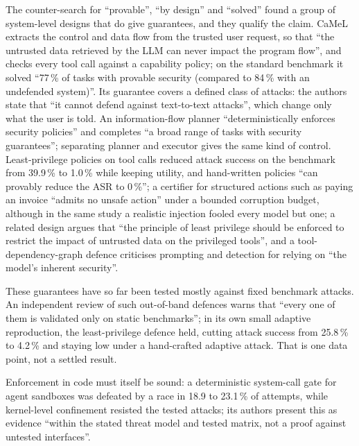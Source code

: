 The counter-search for \enquote{provable}, \enquote{by design} and
\enquote{solved} found a group of system-level designs that do give
guarantees, and they qualify the claim. CaMeL extracts the control and
data flow from the trusted user request, so that \enquote{the untrusted
data retrieved by the LLM can never impact the program flow}, and checks
every tool call against a capability policy; on the standard benchmark
it solved \enquote{77\,\% of tasks with provable security (compared to
84\,\% with an undefended system)}\autocite{Debenedetti2026CaMeL}. Its
guarantee covers a defined class of attacks: the authors state that
\enquote{it cannot defend against text-to-text attacks}, which change
only what the user is told. An information-flow planner
\enquote{deterministically enforces security policies} and completes
\enquote{a broad range of tasks with security
guarantees}\autocite{Costa2026FIDES}; separating planner and executor
gives the same kind of control\autocite{Wu2024IFC}. Least-privilege
policies on tool calls reduced attack success on the benchmark from
39.9\,\% to 1.0\,\% while keeping utility, and hand-written policies
\enquote{can provably reduce the ASR to 0\,\%}\autocite{Shi2025Progent};
a certifier for structured actions such as paying an invoice
\enquote{admits no unsafe action} under a bounded corruption budget,
although in the same study a realistic injection fooled every model but
one\autocite{Pandey2026Certified};
a related design argues that \enquote{the principle of least privilege
should be enforced to restrict the impact of untrusted data on the
privileged tools}\autocite{Kim2025PFI}, and a tool-dependency-graph
defence criticises prompting and detection for relying on \enquote{the
model's inherent security}\autocite{An2025IPIGuard}.

These guarantees have so far been tested mostly against fixed benchmark
attacks. An independent review of such out-of-band defences warns that
\enquote{every one of them is validated only on static benchmarks}; in its
own small adaptive reproduction, the least-privilege defence held, cutting
attack success from 25.8\,\% to 4.2\,\% and staying low under a
hand-crafted adaptive attack\autocite{Narisetty2026OutOfBand}. That is
one data point, not a settled result.

Enforcement in code must itself be sound: a deterministic system-call
gate for agent sandboxes was defeated by a race in 18.9 to 23.1\,\% of
attempts, while kernel-level confinement resisted the tested attacks; its
authors present this as evidence \enquote{within the stated threat model
and tested matrix, not a proof against untested
interfaces}\autocite{Erisen2026Seccomp}.

